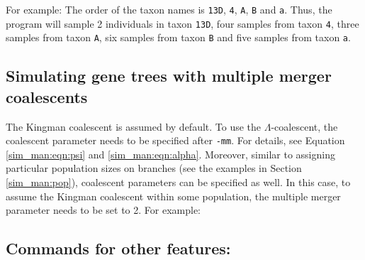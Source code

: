 For example:
The order of the taxon names is {\tt 13D}, {\tt 4}, {\tt A}, {\tt B} and {\tt a}. Thus, the program
will sample 2 individuals in taxon {\tt 13D}, four samples from taxon {\tt 4}, three samples from taxon {\tt A}, six samples from taxon {\tt B} and five samples from taxon {\tt a}.


\subsection{Simulating gene trees with multiple merger coalescents}
The Kingman coalescent is assumed by default. To use the $\Lambda$-coalescent, the coalescent parameter needs to be specified after {\tt -mm}. For details, see Equation \eqref{sim_man:eqn:psi} and \eqref{sim_man:eqn:alpha}.
Moreover, similar to assigning particular population sizes on branches (see the examples in Section \ref{sim_man:pop}), coalescent parameters can be specified as well. In this case, to assume the Kingman coalescent within some population, the multiple merger parameter needs to be set to 2. For example:


\subsection{Commands for other features:}
